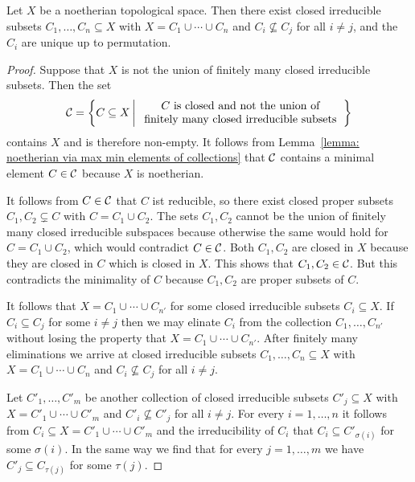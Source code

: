 \begin{proposition}
  \label{proposition: irreducible components of noetherian space alternative construction}
  Let $X$ be a noetherian topological space.
  Then there exist closed irreducible subsets $C_1, \dotsc, C_n \subseteq X$ with $X = C_1 \cup \dotsb \cup C_n$ and $C_i \nsubseteq C_j$ for all $i \neq j$, and the $C_i$ are unique up to permutation.
\end{proposition}


\begin{proof}
  Suppose that $X$ is not the union of finitely many closed irreducible subsets.
  Then the set
  \[
      \mc{C}
    = \left\{
        C \subseteq X
      \suchthat*
        \begin{tabular}{c}
          $C$ is closed and not the union of \\
          finitely many closed irreducible subsets
        \end{tabular}
      \right\}
  \]
  contains $X$ and is therefore non-empty.
  It follows from Lemma~\ref{lemma: noetherian via max min elements of collections} that $\mathcal{C}$ contains a minimal element $C \in \mathcal{C}$ because $X$ is noetherian.
  
  It follows from $C \in \mathcal{C}$ that $C$ ist reducible, so there exist closed proper subsets $C_1, C_2 \subsetneq C$ with $C = C_1 \cup C_2$.
  The sets $C_1, C_2$ cannot be the union of finitely many closed irreducible subspaces because otherwise the same would hold for $C = C_1 \cup C_2$, which would contradict $C \in \mathcal{C}$.
  Both $C_1, C_2$ are closed in $X$ because they are closed in $C$ which is closed in $X$.
  This shows that $C_1, C_2 \in \mathcal{C}$.
  But this contradicts the minimality of $C$ because $C_1, C_2$ are proper subsets of $C$.
  
  It follows that $X = C_1 \cup \dotsb \cup C_{n'}$ for some closed irreducible subsets $C_i \subseteq X$.
  If $C_i \subseteq C_j$ for some $i \neq j$ then we may elinate $C_i$ from the collection $C_1, \dotsc, C_{n'}$ without losing the property that $X = C_1 \cup \dotsb \cup C_{n'}$.
  After finitely many eliminations we arrive at closed irreducible subsets $C_1, \dotsc, C_n \subseteq X$ with $X = C_1 \cup \dotsb \cup C_n$ and $C_i \nsubseteq C_j$ for all $i \neq j$.
  
  Let $C'_1, \dotsc, C'_m$ be another collection of closed irreducible subsets $C'_j \subseteq X$ with $X = C'_1 \cup \dotsb \cup C'_m$ and $C'_i \nsubseteq C'_j$ for all $i \neq j$.
  For every $i = 1, \dotsc, n$ it follows from $C_i \subseteq X = C'_1 \cup \dotsb \cup C'_m$ and the irreducibility of $C_i$ that $C_i \subseteq C'_{\sigma(i)}$ for some $\sigma(i)$.
  In the same way we find that for every $j = 1, \dotsc, m$ we have $C'_j \subseteq C_{\tau(j)}$ for some $\tau(j)$.
  

\end{proof}
